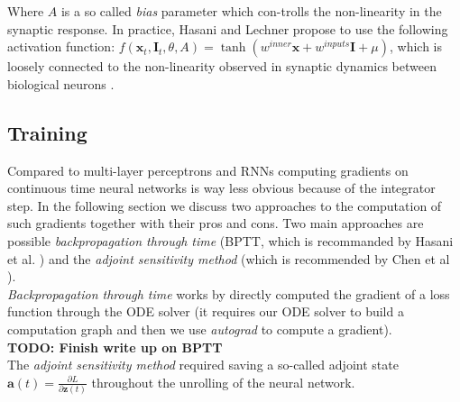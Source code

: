 Where $A$ is a so called \textit{bias} parameter which con-trolls the non-linearity in the synaptic response. In practice, Hasani and Lechner propose to use the following activation function: $f(\bm{x}_t, \bm{I}_t, \theta, A) = \tanh (w^\textit{inner} \bm{x} + w^\textit{inputs} \bm{I} + \mu)$, which is loosely connected to the non-linearity observed in synaptic dynamics between biological neurons \cite{Lechner2020NeuralCP}.

\begin{table}[h!]
\centering
\caption{Time-Continuous Neural Network Classes}
\end{table}


\subsection{Training}

Compared to multi-layer perceptrons and RNNs computing gradients on continuous time neural networks is way less obvious because of the integrator step. In the following section we discuss two approaches to the computation of such gradients together with their pros and cons. Two main approaches are possible \textit{backpropagation through time} (BPTT, which is recommanded by Hasani et al. \cite{Hasani2021LiquidTN}) and the \textit{adjoint sensitivity method} (which is recommended by Chen et al \cite{Chen2018NeuralOD}). \\

\textit{Backpropagation through time} works by directly computed the gradient of a loss function through the ODE solver (it requires our ODE solver to build a computation graph and then we use \textit{autograd} to compute a gradient). \\
\textbf{TODO: Finish write up on BPTT}
\\
The \textit{adjoint sensitivity method} required saving a so-called adjoint state $\bm{a}(t) = \frac{\partial L}{\partial \bm{z}(t)}$ throughout the unrolling of the neural network.

